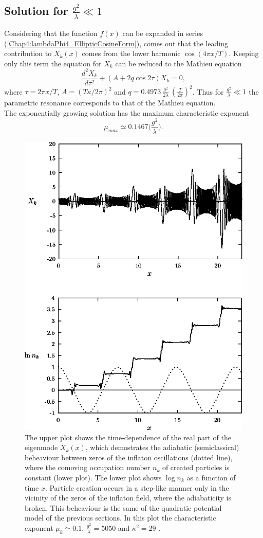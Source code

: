 \documentclass[11pt,a4paper,twoside]{book}
\begin{document}
\subsection*{Solution for $ \frac{g^{2}}{\lambda} \ll 1 $}
Considering that the function $ f(x) $ can be expanded in series (\ref{Chap4:lambdaPhi4_EllipticCosineForm}), comes out that the leading contribution to $ X_{k}(x) $ comes from the lower harmonic $ \cos(4\pi x/T) $. Keeping only this term the equation for $ X_{k} $ can be reduced to the Mathieu equation
\begin{equation}
\label{Chap4:lambdaPhi4_MathieuEquationCase}
\frac{d^{2}X_{k}}{d\tau^{2}} + (A+2q\cos 2\tau)X_{k}=0,
\end{equation}
where $ \tau=2\pi x/T $, $ A=(T\kappa/2\pi)^{2} $ and $ q=0.4973\ \frac{g^{2}}{2\lambda}\ (\frac{T}{2\pi})^{2} $. Thus for $ \frac{g^{2}}{\lambda} \ll 1 $ the parametric resonance corresponds to that of the Mathieu equation. \\
The exponentially growing solution has the maximum characteristic exponent
\begin{equation}
\mu_{max} \simeq 0.1467 \Bigg(\frac{g^{2}}{\lambda}\Bigg).
\end{equation}
\begin{figure}[h]
	\centering
	\includegraphics[width=0.6\linewidth, height=0.45\textheight]{Images/Chap4/ConformalTheory_Fig7}
	\caption{The upper plot shows the time-dependence of the real part of the eigenmode $ X_{k}(x) $, which demostrates the adiabatic (semiclassical) beheaviour between zeros of the inflaton oscillations (dotted line), where the comoving occupation number $ n_{k} $ of created particles is constant (lower plot). The lower plot shows $\log n_{k}$ as a function of time $ x $. Particle creation occurs in a step-like manner only in the vicinity of the zeros of the inflaton field, where the adiabaticity is broken. This beheaviour is the same of the quadratic potential model of the previous sections. In this plot the characteristic exponent $ \mu_{k}\simeq 0.1 $, $ \frac{g^{2}}{\lambda}=5050 $ and $\kappa^{2}=29$ \cite{Chap4:ModelLambdaPhi4Reference}.}
	\label{fig:conformaltheoryfig7}
\end{figure}
\end{document}
